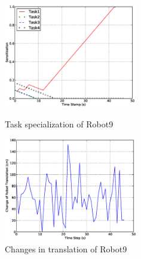 \documentclass{llncs}
\begin{document}
\begin{figure}
\begin{minipage}[t]{0.5\linewidth}
\centering
\includegraphics[height=4.5cm, angle=0]{images/global/PlotRobot9-Sensitizations-2010Feb18-121037.eps}
\caption{\small Task specialization of Robot9}
\label{fig:single-robot-sensitizations} %
\end{minipage} 
\begin{minipage}[t]{0.5\linewidth}
\centering
\includegraphics[height=4.5cm, angle=0]{images/global/DeltaRobot9-PoseAtTS-2010Feb18-121037.eps}
\caption{\small Changes in translation of Robot9}
\label{fig:single-robot-translation} %
\end{minipage}
\end{figure}
\end{document}
